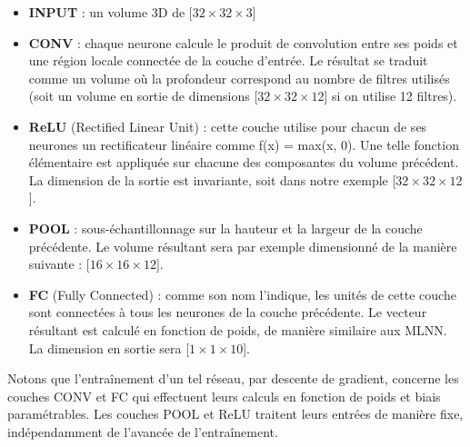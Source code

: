 \documentclass[12pt]{report}
\begin{document}
\begin{itemize}
  \item \textbf{INPUT} : un volume 3D de [$32 \times 32 \times 3$]
  \item \textbf{CONV} : chaque neurone calcule le produit de convolution entre ses poids et une région locale connectée de la couche d’entrée. Le résultat se traduit comme un volume où la profondeur correspond au nombre de filtres utilisés (soit un volume en sortie de dimensions [$32 \times 32 \times 12$] si on utilise 12 filtres).

  \item \textbf{ReLU} (Rectified Linear Unit) : cette couche utilise pour chacun de ses neurones un rectificateur linéaire comme f(x) = max(x, 0). Une telle fonction élémentaire est appliquée sur chacune des composantes du volume précédent. La dimension de la sortie est invariante, soit dans notre exemple [$32 \times 32 \times 12$]. 
  \item \textbf{POOL} : sous-échantillonnage sur la hauteur et la largeur de la couche précédente. Le volume résultant sera par exemple dimensionné de la manière suivante : [$16 \times 16 \times 12$].
  \item \textbf{FC} (Fully Connected) : comme son nom l’indique, les unités de cette couche sont connectées à tous les neurones de la couche précédente. Le vecteur résultant est calculé en fonction de poids, de manière similaire aux \gls{MLNN}. La dimension en sortie sera [$1 \times 1 \times 10$].

\end{itemize}
Notons que l’entraînement d’un tel réseau, par descente de gradient, concerne les couches CONV et FC qui effectuent leurs calculs en fonction de poids et biais paramétrables. Les couches POOL et ReLU traitent leurs entrées de manière fixe, indépendamment de l’avancée de l’entraînement.
\end{document}
